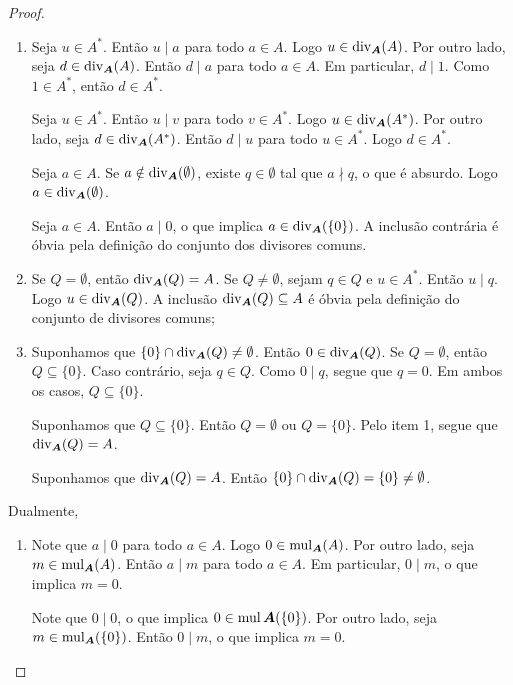 \begin{proof}
	\begin{enumerate}
	\item Seja $u \in A^*$. Então $u \mid a$ para todo $a \in A$. Logo $u \in \operatorname{div}_{\bm A}(A)$. Por outro lado, seja $d \in \operatorname{div}_{\bm A}(A)$. Então $d \mid a$ para todo $a \in A$. Em particular, $d \mid 1$. Como $1 \in A^*$, então $d \in A^*$.

	Seja $u \in A^*$. Então $u \mid v$ para todo $v \in A^*$. Logo $u \in \operatorname{div}_{\bm A}(A^*)$. Por outro lado, seja $d \in \operatorname{div}_{\bm A}(A^*)$. Então $d \mid u$ para todo $u \in A^*$. Logo $d \in A^*$.

	Seja $a \in A$. Se $a \notin \operatorname{div}_{\bm A}(\emptyset)$, existe $q \in \emptyset$ tal que $a \nmid q$, o que é absurdo. Logo $a \in \operatorname{div}_{\bm A}(\emptyset)$.

	Seja $a \in A$. Então $a \mid 0$, o que implica $a \in \operatorname{div}_{\bm A}(\{0\})$. A inclusão contrária é óbvia pela definição do conjunto dos divisores comuns.

	\item Se $Q = \emptyset$, então $\operatorname{div}_{\bm A}(Q) = A$. Se $Q \neq \emptyset$, sejam $q \in Q$ e $u \in A^*$. Então $u \mid q$. Logo $u \in \operatorname{div}_{\bm A}(Q)$. A inclusão $\operatorname{div}_{\bm A}(Q) \subseteq A$ é óbvia pela definição do conjunto de divisores comuns;

	\item Suponhamos que $\{0\} \cap \operatorname{div}_{\bm A}(Q) \neq \emptyset$. Então $0 \in \operatorname{div}_{\bm A}(Q)$. Se $Q = \emptyset$, então $Q \subseteq \{0\}$. Caso contrário, seja $q \in Q$. Como $0 \mid q$, segue que $q=0$. Em ambos os casos, $Q \subseteq \{0\}$.

	Suponhamos que $Q \subseteq \{0\}$. Então $Q=\emptyset$ ou $Q=\{0\}$. Pelo item 1, segue que $\operatorname{div}_{\bm A}(Q)=A$.

	Suponhamos que $\operatorname{div}_{\bm A}(Q)=A$. Então $\{0\} \cap \operatorname{div}_{\bm A}(Q) = \{0\} \neq \emptyset$.
	\end{enumerate}

	Dualmente,
	\begin{enumerate}
	\item Note que $a \mid 0$ para todo $a \in A$. Logo $0 \in \operatorname{mul}_{\bm A}(A)$. Por outro  lado, seja $m \in \operatorname{mul}_{\bm A}(A)$. Então $a \mid m$ para todo $a \in A$. Em particular, $0 \mid m$, o que implica $m=0$.

	Note que $0 \mid 0$, o que implica $0 \in \operatorname{mul}{\bm A}(\{0\})$. Por outro lado, seja $m \in \operatorname{mul}_{\bm A}(\{0\})$. Então $0 \mid m$, o que implica $m=0$.


\end{enumerate}
\end{proof}
